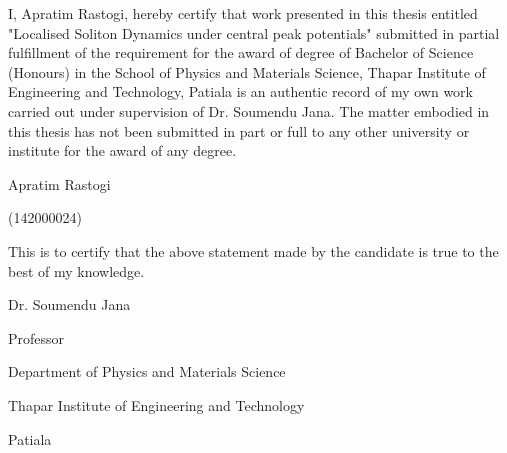 I, Apratim Rastogi, hereby certify that work presented in this thesis 
entitled "Localised Soliton Dynamics under central peak potentials" 
submitted in partial fulfillment of the requirement for the award of 
degree of Bachelor of Science (Honours) in the School of Physics and Materials Science, 
Thapar Institute of Engineering and Technology, Patiala is an authentic record of my own 
work carried out under supervision of Dr. Soumendu Jana. The matter embodied in this 
thesis has not been submitted in part or full to any other university or institute for the award of
any degree.

\vspace*{25pt}
\hfill Apratim Rastogi
\vspace*{-0.5cm}

\hfill{(142000024)}

This is to certify that the above statement made by the candidate is true to the best 
of my knowledge.

\vspace*{25pt}

\hfill {Dr. Soumendu Jana}
\vspace*{-0.5cm}

\hfill{Professor}
\vspace*{-0.5cm}

\hfill{Department of Physics and Materials Science}
\vspace*{-0.5cm}

\hfill{Thapar Institute of Engineering and Technology}
\vspace*{-0.5cm}

\hfill{Patiala}
